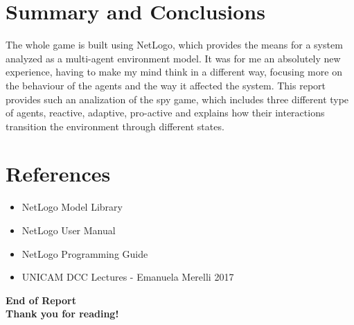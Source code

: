 \documentclass[12pt]{article}
\begin{document}
\section{Summary and Conclusions}
The whole game is built using NetLogo, which provides the means for a system analyzed as a multi-agent environment model. It was for me an absolutely new experience, having to make my mind think in a different way, focusing more on the behaviour of the agents and the way it affected the system. This report provides such an analization of the spy game, which includes three different type of agents, reactive, adaptive, pro-active and explains how their interactions transition the environment through different states.
\newpage
\section{References}
\begin{itemize}
\item NetLogo Model Library
\item NetLogo User Manual
\item NetLogo Programming Guide
\item UNICAM DCC Lectures - Emanuela Merelli 2017
\end{itemize}
\vfill
\begin{Huge}
\begin{center}
\textbf{End of Report}\\
\textbf{Thank you for reading!}\\
\end{center}
\end{Huge}
\end{document}
